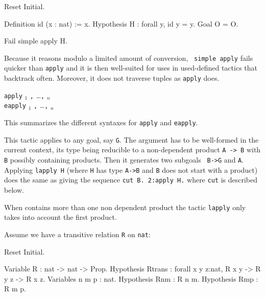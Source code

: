 \begin{Variants}
\begin{coq_eval}
Reset Initial.
\end{coq_eval}
\begin{coq_example*}
Definition id (x : nat) := x.
Hypothesis H : forall y, id y = y.
Goal O = O.
\end{coq_example*}
\begin{coq_example}
Fail simple apply H.
\end{coq_example}

  Because it reasons modulo a limited amount of conversion, {\tt
  simple apply} fails quicker than {\tt apply} and it is then
  well-suited for uses in used-defined tactics that backtrack often.
  Moreover, it does not traverse tuples as {\tt apply} does.

\item {} {\tt apply} {\term$_1$}  {\tt ,} \ldots {\tt ,} {\term$_n$} \\
   {\tt eapply} {\term$_1$}  {\tt ,} \ldots {\tt ,} {\term$_n$} 

  This summarizes the different syntaxes for {\tt apply} and {\tt eapply}.

\item {} 

  This tactic applies to any goal, say {\tt G}.  The argument {\term}
  has to be well-formed in the current context, its type being
  reducible to a non-dependent product {\tt A -> B} with {\tt B}
  possibly containing products. Then it generates two subgoals {\tt
  B->G} and {\tt A}. Applying {\tt lapply H} (where {\tt H} has type
  {\tt A->B} and {\tt B} does not start with a product) does the same
  as giving the sequence {\tt cut B. 2:apply H.} where {\tt cut} is
  described below.

  \Warning When {\term} contains more than one non
  dependent product the tactic {\tt lapply} only takes into account the
  first product.

\end{Variants}

\Example
Assume we have a transitive relation {\tt R} on {\tt nat}:
\label{eapply-example}

\begin{coq_eval}
Reset Initial.
\end{coq_eval}
\begin{coq_example*}
Variable R : nat -> nat -> Prop.
Hypothesis Rtrans : forall x y z:nat, R x y -> R y z -> R x z.
Variables n m p : nat.
Hypothesis Rnm : R n m.
Hypothesis Rmp : R m p.
\end{coq_example*}

